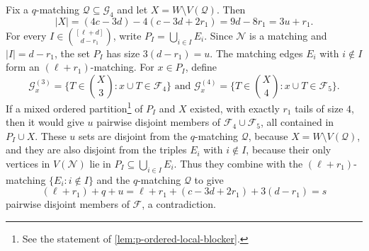\documentclass[10pt,a4paper]{article}
\numberwithin{equation}{section}
\theoremstyle{definition}
\newcommand{\F}{\mathcal F}
\newcommand{\G}{\mathcal G}
\begin{document}
Fix a $q$-matching $\mathcal Q\subseteq\G_4$ and let $X=W\setminus V(\mathcal Q)$.
Then
\[
        |X|=(4c-3d)-4(c-3d+2r_1)=9d-8r_1=3u+r_1.
\]
For every $I\in\binom{[\ell+d]}{d-r_1}$, write $P_I=\bigcup_{i\in I}E_i$.
Since $\mathcal N$ is a matching and $|I|=d-r_1$, the set $P_I$ has size $3(d-r_1)=u$.
The matching edges $E_i$ with $i\notin I$ form an $(\ell+r_1)$-matching.
For $x\in P_I$, define
\[
        \G_x^{(3)}=\{T\in\binom X3:x\cup T\in\F_4\} \text{ and }
        \G_x^{(4)}=\{T\in\binom X4:x\cup T\in\F_5\}.
\]
If a mixed ordered partition\footnote{See the statement of \cref{lem:p-ordered-local-blocker}.} of $P_I$ and $X$ existed, with exactly $r_1$ tails of size $4$, then it would give $u$ pairwise disjoint members of $\F_4\cup\F_5$, all contained in $P_I\cup X$.
These $u$ sets are disjoint from the $q$-matching $\mathcal Q$, because $X=W\setminus V(\mathcal Q)$, and they are also disjoint from the triples $E_i$ with $i\notin I$, because their only vertices in $V(\mathcal N)$ lie in $P_I\subseteq\bigcup_{i\in I}E_i$.
Thus they combine with the $(\ell+r_1)$-matching $\{E_i:i\notin I\}$ and the $q$-matching $\mathcal Q$ to give
\[
        (\ell+r_1)+q+u
        =\ell+r_1+(c-3d+2r_1)+3(d-r_1)=s
\]
pairwise disjoint members of $\F$, a contradiction.
\end{document}
